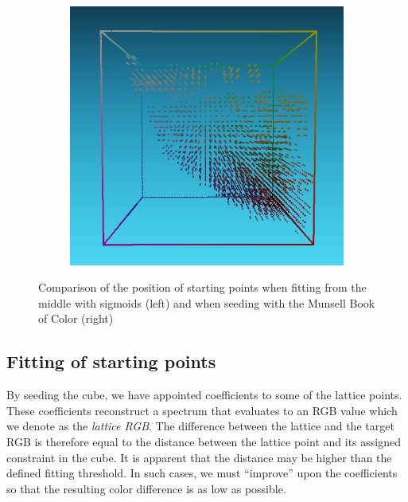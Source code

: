 \begin{figure}[t]
\begin{subfigure}[t]{0.45\textwidth}
		\includegraphics[width=\linewidth]{img/seededStarting_mcb.png}
		\label{fig:seededStarting_mcb}
	\end{subfigure}
	\caption{Comparison of the position of starting points when fitting from the middle with sigmoids (left)
	 and when seeding with the Munsell Book of Color (right)}
	\label{fig:seededStartingPoints}
\end{figure}

\subsection{Fitting of starting points} \label{ssec:startingPointsFitting}

By seeding the cube, we have appointed coefficients to some of the lattice points. These coefficients reconstruct a spectrum that evaluates to an RGB value which we denote as the \emph{lattice RGB}. The difference between the lattice and the target RGB is therefore equal to the distance between the lattice point and its assigned constraint in the cube. It is apparent that the distance may be higher than the defined fitting threshold. In such cases, we must ``improve'' upon the coefficients so that the resulting color difference is as low as possible.


